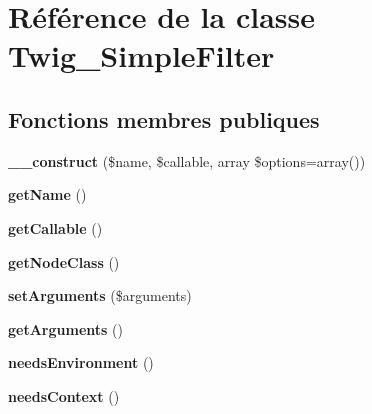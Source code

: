 \hypertarget{class_twig___simple_filter}{}\section{Référence de la classe Twig\+\_\+\+Simple\+Filter}
\label{class_twig___simple_filter}
\subsection*{Fonctions membres publiques}
\begin{DoxyCompactItemize}
\item 
{\bfseries \+\_\+\+\_\+construct} (\$name, \$callable, array \$options=array())\hypertarget{class_twig___simple_filter_a1e24fc85f3981c10f1e71d93a4f54144}{}\label{class_twig___simple_filter_a1e24fc85f3981c10f1e71d93a4f54144}

\item 
{\bfseries get\+Name} ()\hypertarget{class_twig___simple_filter_a3d0963e68bb313b163a73f2803c64600}{}\label{class_twig___simple_filter_a3d0963e68bb313b163a73f2803c64600}

\item 
{\bfseries get\+Callable} ()\hypertarget{class_twig___simple_filter_a0be839e0782a38a172c386bd963375c9}{}\label{class_twig___simple_filter_a0be839e0782a38a172c386bd963375c9}

\item 
{\bfseries get\+Node\+Class} ()\hypertarget{class_twig___simple_filter_a8d85021f1f19e71dd99d7dfdd138c927}{}\label{class_twig___simple_filter_a8d85021f1f19e71dd99d7dfdd138c927}

\item 
{\bfseries set\+Arguments} (\$arguments)\hypertarget{class_twig___simple_filter_a2b7df0e0f61ee886144db2d59fc0d7da}{}\label{class_twig___simple_filter_a2b7df0e0f61ee886144db2d59fc0d7da}

\item 
{\bfseries get\+Arguments} ()\hypertarget{class_twig___simple_filter_a1d4c324c5a088be98d99d3efbf3502e1}{}\label{class_twig___simple_filter_a1d4c324c5a088be98d99d3efbf3502e1}

\item 
{\bfseries needs\+Environment} ()\hypertarget{class_twig___simple_filter_a711311882c7dd1058f92f7eb0e8edeeb}{}\label{class_twig___simple_filter_a711311882c7dd1058f92f7eb0e8edeeb}

\item 
{\bfseries needs\+Context} ()\hypertarget{class_twig___simple_filter_a52c35bc6da8861f40aa59f1b99f7ef0f}{}\label{class_twig___simple_filter_a52c35bc6da8861f40aa59f1b99f7ef0f}


\end{DoxyCompactItemize}
